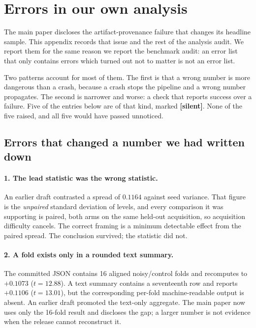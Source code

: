 \documentclass[10pt,twocolumn,letterpaper]{article}
\begin{document}
\section{Errors in our own analysis}
\label{sec:errors}

The main paper discloses the artifact-provenance failure that changes its headline
sample. This appendix records that issue and the rest of the analysis audit. We
report them for the same reason we report the benchmark audit: an error list that
only contains errors which turned out not to matter is not an error list.

Two patterns account for most of them. The first is that a wrong number is more
dangerous than a crash, because a crash stops the pipeline and a wrong number
propagates. The second is narrower and worse: a check that reports success over a
failure. Five of the entries below are of that kind, marked \textbf{[silent]}. None of
the five raised, and all five would have passed unnoticed.

\subsection{Errors that changed a number we had written down}

\paragraph{1. The lead statistic was the wrong statistic.} An earlier draft
contrasted a spread of $0.1164$ against seed variance. That figure is the
\emph{unpaired} standard deviation of levels, and every comparison it was supporting
is paired, both arms on the same held-out acquisition, so acquisition difficulty
cancels. The correct framing is a minimum detectable effect from the paired spread.
The conclusion survived; the statistic did not.

\paragraph{2. A fold exists only in a rounded text summary.}
The committed JSON contains 16 aligned noisy/control folds and recomputes to
$+0.1073$ ($t=12.88$). A text summary contains a seventeenth row and reports
$+0.1106$ ($t=13.01$), but the corresponding per-fold machine-readable output is
absent. An earlier draft promoted the text-only aggregate. The main paper now uses
only the 16-fold result and discloses the gap; a larger number is not evidence when
the release cannot reconstruct it.
\end{document}
